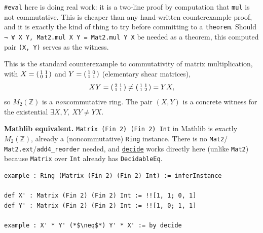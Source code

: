 \texttt{\#eval} here is doing real work: it is a two-line proof by computation that \texttt{mul} is not commutative. This is cheaper than any hand-written counterexample proof, and it is exactly the kind of thing to try before committing to a \texttt{theorem}. Should \texttt{¬ ∀ X Y, Mat2.mul X Y = Mat2.mul Y X} be needed as a theorem, this computed pair \texttt{(X, Y)} serves as the witness.

\begin{mathreading}

This is the standard counterexample to commutativity of matrix multiplication, with \(X =
\begin{psmallmatrix}1&1\\0&1\end{psmallmatrix}\) and \(Y =
\begin{psmallmatrix}1&0\\1&1\end{psmallmatrix}\) (elementary shear matrices), \[
XY = \begin{psmallmatrix}2&1\\1&1\end{psmallmatrix} \neq
\begin{psmallmatrix}1&1\\1&2\end{psmallmatrix} = YX,
\] so \(M_2(\mathbb{Z})\) is a \emph{non}commutative ring. The pair \((X, Y)\) is a concrete witness for the existential \(\exists X, Y,\ XY \neq YX\).

\end{mathreading}

\textbf{Mathlib equivalent.} \texttt{Matrix (Fin 2) (Fin 2) Int} in Mathlib is exactly \(M_2(\mathbb{Z})\), already a (noncommutative) \texttt{Ring} instance. There is no \texttt{Mat2}/ \texttt{Mat2.ext}/\texttt{add4\_\allowbreak{}reorder} needed, and \href{https://lean-lang.org/doc/reference/latest/Tactic-Proofs/Tactic-Reference/}{\texttt{decide}} works directly here (unlike \texttt{Mat2}) because \texttt{Matrix} over \texttt{Int} already has \texttt{DecidableEq}.

\begin{lstlisting}
example : Ring (Matrix (Fin 2) (Fin 2) Int) := inferInstance

def X' : Matrix (Fin 2) (Fin 2) Int := !![1, 1; 0, 1]
def Y' : Matrix (Fin 2) (Fin 2) Int := !![1, 0; 1, 1]

example : X' * Y' (*$\neq$*) Y' * X' := by decide
\end{lstlisting}

